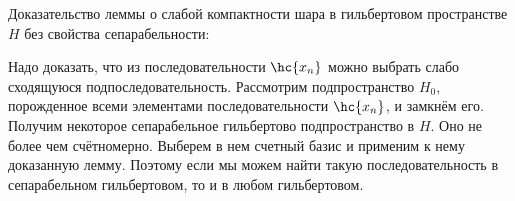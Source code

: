 \documentclass[a4paper]{article}
\begin{document}
Доказательство леммы о слабой компактности шара в гильбертовом пространстве $H$ без свойства сепарабельности:

Надо доказать, что из последовательности $\hc{x_n}$ можно выбрать слабо сходящуюся подпоследовательность. Рассмотрим подпространство
$H_0$, порожденное всеми элементами последовательности $\hc{x_n}$, и замкнём его. Получим некоторое сепарабельное
гильбертово подпространство в $H$. Оно не более чем счётномерно. Выберем в нем счетный базис и применим к нему доказанную лемму.
Поэтому если мы можем найти такую последовательность в сепарабельном гильбертовом, то и в любом гильбертовом.
\end{document}
